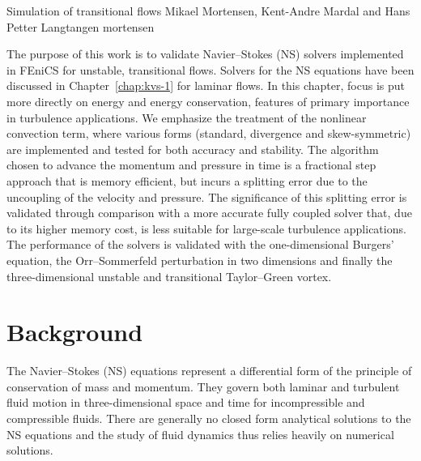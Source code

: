 \renewcommand{\vec}[1]{\ensuremath{{#1}}}
\newcommand{\Nset}{\ensuremath{\mathbb{N}}\xspace}
\newcommand{\Zset}{\ensuremath{\mathbb{Z}}\xspace}
\newcommand{\Qset}{\ensuremath{\mathbb{Q}}\xspace}
\newcommand{\Cset}{\ensuremath{\mathbb{C}}\xspace}
\newcommand{\Hdivnull}{\ensuremath{Z}}

              {Simulation of transitional flows}
              {Mikael Mortensen, Kent-Andre Mardal and Hans Petter Langtangen}
              {mortensen}



The purpose of this work is to validate Navier--Stokes (NS) solvers
implemented in FEniCS for unstable, transitional flows. Solvers for
the NS equations have been discussed in Chapter~\ref{chap:kvs-1} for
laminar flows. In this chapter, focus is put more directly on energy
and energy conservation, features of primary importance in turbulence
applications. We emphasize the treatment of the nonlinear convection
term, where various forms (standard, divergence and skew-symmetric) are
implemented and tested for both accuracy and stability. The algorithm
chosen to advance the momentum and pressure in time is a fractional
step approach that is memory efficient, but incurs a splitting error
due to the uncoupling of the velocity and pressure. The significance
of this splitting error is validated through comparison with a more
accurate fully coupled solver that, due to its higher memory cost, is
less suitable for large-scale turbulence applications. The performance
of the solvers is validated with the one-dimensional Burgers' equation,
the Orr--Sommerfeld perturbation in two dimensions and finally the
three-dimensional unstable and transitional Taylor--Green vortex.

\section{Background}

The Navier--Stokes (NS) equations represent a differential form of the
principle of conservation of mass and momentum. They govern both laminar
and turbulent fluid motion in three-dimensional space and time for
incompressible and compressible fluids. There are generally no closed
form analytical solutions to the NS equations and the study of fluid
dynamics thus relies heavily on numerical solutions.

